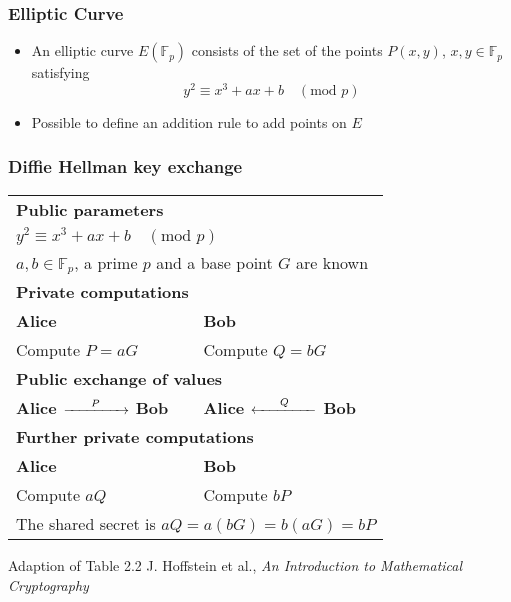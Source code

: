 \begin{frame}
  \frametitle{Elliptic Curve}
  \begin{itemize}
  \setlength\itemsep{1.5em}
  \item{
  An elliptic curve $E(\mathbb{F}_p)$ consists of the set of the points $P(x,y)$, $x,y \in \mathbb{F}_p$ satisfying
  \begin{equation*}
  y^2 \equiv x^3 + ax + b \quad (\text{mod } p)
  \end{equation*}
  }
  \item{
  Possible to define an addition rule to add points on $E$
  }
  \end{itemize}
\end{frame}
\begin{frame}
  \frametitle{Diffie Hellman key exchange}
  \begin{tabular}{|p{5cm} p{5cm} |}
      \hline			
      \multicolumn{2}{|p{10cm}|}{\rule{0em}{1.2em}\bf{Public parameters}}\\
      \multicolumn{2}{|p{10cm}|}{$ y^2 \equiv x^3 + ax + b \quad (\text{mod } p)$}\\
      \multicolumn{2}{|p{10cm}|}{$a,b \in \mathbb{F}_p$, a prime $p$ and a base point $G$ are known}\\
      \hline
      \multicolumn{2}{|p{10cm}|}{\rule{0em}{1.2em}\bf{Private computations}}\\
      \bf{\small{Alice}} & \bf{\small{Bob}}\\
      Compute $P = aG$ &  Compute $Q = bG$ \\
      \hline
      \multicolumn{2}{|p{10cm}|}{\rule{0em}{1.2em}\bf{Public exchange of values}}\\
      \bf{\small{Alice}} $\xrightarrow{\hspace*{0.6cm}P\hspace*{0.6cm}}$ \bf{\small{Bob}}
      &
      \bf{\small{Alice}} $\xleftarrow{\hspace*{0.6cm}Q\hspace*{0.6cm}}$ \bf{\small{Bob}}
      \\
      \hline
      \multicolumn{2}{|p{10cm}|}{\rule{0em}{1.2em}\bf{Further private computations}}\\
      \bf{\small{Alice}} & \bf{\small{Bob}}\\
      Compute $aQ$ & Compute $bP$ \\
      \multicolumn{2}{|p{10cm}|}{
      The shared secret is $aQ = a(bG) = b(aG) = bP$}\\ \hline
    \end{tabular}
    \vfill
    \tiny{Adaption of Table 2.2 J. Hoffstein et al., \emph{An Introduction to Mathematical Cryptography}}
\end{frame}
